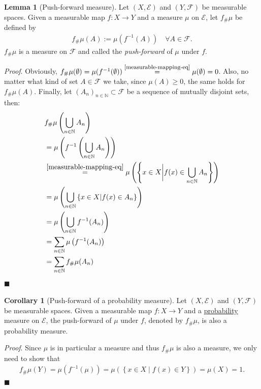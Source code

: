 \documentclass[12pt, a4paper]{article}
\numberwithin{equation}{section}
\theoremstyle{definition}
\theoremstyle{definition}
\newtheorem{lemma}[thm]{Lemma} %
\newtheorem{corollary}[thm]{Corollary}
\begin{document}
	\begin{lemma}[Push-forward measure]\label{push-forward-measure}
		Let $(X, \mathcal E)$ and $(Y, \mathcal F)$ be measurable spaces. Given a measurable map $f: X\rightarrow Y$ and a measure $\mu$ on $\mathcal E$, let $f_{\#}\mu$ be defined by 
		\begin{align}
			f_{\#}\mu(A) := \mu(f^{-1}(A)) \quad \forall A\in \mathcal F. 
		\end{align}
		$f_{\#}\mu$ is a measure on $\mathcal F$ and called the \textit{push-forward} of $\mu$ under $f$. 
	\end{lemma}

	\noindent 
	\textit{Proof}. Obviously, $f_{\#}\mu(\emptyset) = \mu(f^{-1}(\emptyset)) \overset{\footnotesize\eqref{measurable-mapping-eq}}{=} \mu(\emptyset) = 0$. Also, no matter what kind of set $A\in \mathcal F$ we take, since $\mu(A) \geq 0$, the same holds for $f_{\#}\mu(A)$. Finally, let $(A_n)_{n\in\mathbb{N}} \subset \mathcal F$ be a sequence of mutually disjoint sets, then: 
	\begin{align}
		&f_{\#}\mu\left(\bigcup_{n\in\mathbb N}A_n \right) 
					\\ &= 
		\mu\left(f^{-1}\left(\bigcup_{n\in\mathbb N}A_n\right) \right) 
					\\ &\overset{\eqref{measurable-mapping-eq}}{=}
		\mu\left( \left\{ x\in X \bigg\vert f(x) \in  \bigcup_{n\in\mathbb N}A_n \right\}\right) 
					\\ &= 		
		\mu\left( \bigcup_{n\in\mathbb N}\left\{ x\in X \vert f(x)\in A_n \right\} \right) 
					\\ &=
		\mu\left( \bigcup_{n\in\mathbb{N}}f^{-1}(A_n) \right)
					\\ &=
		\sum_{n\in\mathbb N}\mu\left(f^{-1}(A_n)\right)
					\\ &=
		\sum_{n\in\mathbb{N}}f_{\#}\mu(A_n) 
	\end{align} 
	\qquad\qquad\qquad\qquad\qquad\qquad\qquad\qquad\qquad\qquad\qquad\qquad\qquad\qquad\qquad\qquad\qquad\qquad\qquad\qquad\qquad\quad$\blacksquare$
	
	\begin{corollary}[Push-forward of a probability measure]
		Let $(X, \mathcal E)$ and $(Y, \mathcal F)$	be measurable spaces. Given a measurable map $f: X\rightarrow Y$ and a \underline{probability} measure on $\mathcal E$, the push-forward of $\mu$ under $f$, denoted by $f_{\#}\mu$, is also a probability measure. 
	\end{corollary}
	\noindent\textit{Proof}. Since $\mu$ is in particular a measure and thus $f_{\#}\mu$ is also a measure, we only need to show that  
	\begin{align}
		f_{\#}\mu(Y) = \mu\left(f^{-1}\left(\mu\right)\right) = \mu\left(\left\{ x\in X \mid f(x)\in Y  \right\}\right) = \mu(X) = 1. 
	\end{align}
	\qquad\qquad\qquad\qquad\qquad\qquad\qquad\qquad\qquad\qquad\qquad\qquad\qquad\qquad\qquad\qquad\qquad\qquad\qquad\qquad\qquad\quad$\blacksquare$
	
\end{document}
